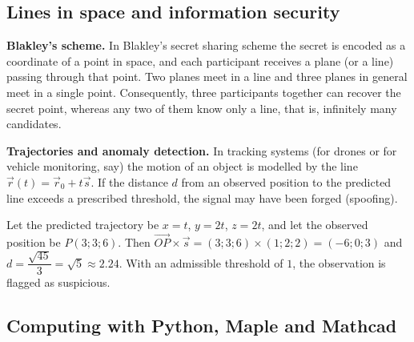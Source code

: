 \subsection{Lines in space and information security}

\textbf{Blakley’s scheme.} In Blakley’s secret sharing scheme the secret is
encoded as a coordinate of a point in space, and each participant receives a
plane (or a line) passing through that point. Two planes meet in a line and
three planes in general meet in a single point. Consequently, three
participants together can recover the secret point, whereas any two of them
know only a line, that is, infinitely many candidates.

\textbf{Trajectories and anomaly detection.} In tracking systems (for drones
or for vehicle monitoring, say) the motion of an object is modelled by the line
$\vec r(t)=\vec r_0+t\vec s$. If the distance $d$ from an observed position to
the predicted line exceeds a prescribed threshold, the signal may have been
forged (spoofing).

\begin{misol}
Let the predicted trajectory be $x=t$, $y=2t$, $z=2t$, and let the observed
position be $P(3;3;6)$. Then
$\overrightarrow{OP}\times\vec s=(3;3;6)\times(1;2;2)=(-6;0;3)$ and
$d=\dfrac{\sqrt{45}}{3}=\sqrt5\approx2.24$. With an admissible threshold of $1$,
the observation is flagged as suspicious.
\end{misol}

\subsection{Computing with Python, Maple and Mathcad}

